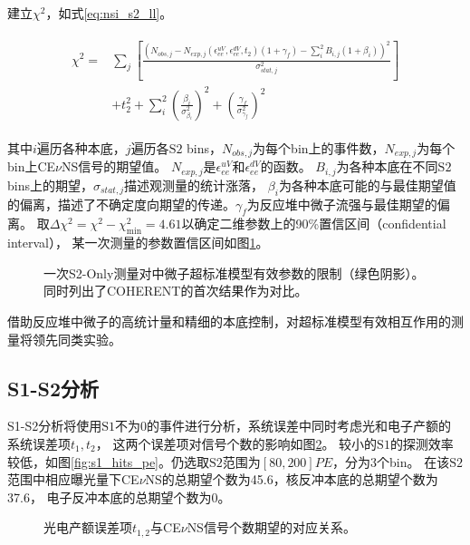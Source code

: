 建立$\chi^2$，如式\ref{eq:nsi_s2_ll}。

\begin{align}
    \label{eq:nsi_s2_ll}
    \begin{split}
    \chi^2 =& \sum_j\left[\frac{\left(N_{obs,j} - N_{exp,j}(\epsilon^{uV}_{ee}, \epsilon^{dV}_{ee}, t_2)(1 + \gamma_f) 
    - \sum_{i}^2 B_{i,j}(1 + \beta_i)\right)^2}{\sigma^2_{stat,j}}\right] \\
    & + t_2^2 + \sum_{i}^2(\frac{\beta_i}{\sigma^2_{\beta_i}})^2 + (\frac{\gamma_f}{\sigma^2_{\gamma_f}})^2
    \end{split}
\end{align}

其中$i$遍历各种本底，$j$遍历各$\mathrm{S2}$ bins，$N_{obs,j}$为每个bin上的事件数，$N_{exp,j}$为每个bin上CE$\nu$NS信号的期望值。
$N_{exp,j}$是$\epsilon^{uV}_{ee}$和$\epsilon^{dV}_{ee}$的函数。
$B_{i,j}$为各种本底在不同$\mathrm{S2}$ bins上的期望，$\sigma_{stat,j}$描述观测量的统计涨落，
$\beta_i$为各种本底可能的与最佳期望值的偏离，描述了不确定度向期望的传递。$\gamma_f$为反应堆中微子流强与最佳期望的偏离。
取$\Delta \chi^2=\chi^2-\chi^2_\mathrm{min}=4.61$以确定二维参数上的90\%置信区间（confidential interval），
某一次测量的参数置信区间如图\ref{fig:nsi_sensitivity_s2only}。

\begin{figure}
  \centering
  
  \caption{\label{fig:nsi_sensitivity_s2only} 一次S2-Only测量对中微子超标准模型有效参数的限制（绿色阴影）。
  同时列出了COHERENT的首次结果作为对比\cite{akimov_observation_2017}。}
\end{figure}

借助反应堆中微子的高统计量和精细的本底控制，对超标准模型有效相互作用的测量将领先同类实验。

\subsection{S1-S2分析}

S1-S2分析将使用$\mathrm{S1}$不为0的事件进行分析，系统误差中同时考虑光和电子产额的系统误差项$t_1,t_2$，
这两个误差项对信号个数的影响如图\ref{fig:exp_s1s2_t1t2}。
较小的$\mathrm{S1}$的探测效率较低，如图\ref{fig:s1_hits_pe}。仍选取$\mathrm{S2}$范围为$[80, 200]\si{PE}$，分为3个bin。
在该$\mathrm{S2}$范围中相应曝光量下CE$\nu$NS的总期望个数为45.6，核反冲本底的总期望个数为37.6，
电子反冲本底的总期望个数为0。

\begin{figure}
  \centering
  
  \caption{\label{fig:exp_s1s2_t1t2} 光电产额误差项$t_{1,2}$与CE$\nu$NS信号个数期望的对应关系。}
\end{figure}

